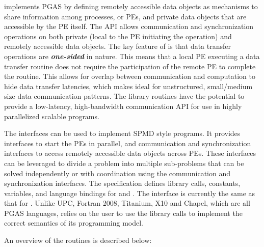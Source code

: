 \openshmem implements \ac{PGAS} by defining remotely accessible data objects as
mechanisms to share information among \openshmem processes, or \acp{PE}, and
private data objects that are accessible by the \ac{PE} itself. The \ac{API}
allows communication and synchronization operations on both private (local to
the PE initiating the operation) and remotely accessible data objects. The key
feature of \openshmem is that data transfer operations are
\textit{\textbf{one-sided}} in nature. This means that a local \ac{PE} executing
a data transfer routine does not require the participation of the remote \ac{PE}
to complete the routine. This allows for overlap between communication and
computation to hide data transfer latencies, which makes  \openshmem ideal for
unstructured, small/medium size data communication patterns. The \openshmem
library routines have the potential to provide a low-latency, high-bandwidth
communication \ac{API} for use in highly parallelized scalable programs.  

The \openshmem{} interfaces can be used to implement \ac{SPMD} style programs.
It provides interfaces to start the \openshmem{} \acp{PE} in parallel, and
communication and synchronization interfaces to access remotely accessible data
objects across \acp{PE}. These interfaces can be leveraged to divide a problem
into multiple sub-problems that can be solved independently or with coordination
using the communication and synchronization interfaces.  The \openshmem
specification defines library calls, constants, variables, and language bindings
for \Cstd and \Fortran.  The \Cpp interface is currently the same as that
for \Cstd. Unlike UPC, Fortran 2008, Titanium, X10 and Chapel, which are all
PGAS languages, \openshmem relies on the user to use the library calls  to
implement the correct semantics of its programming model.

An overview of the \openshmem routines is described below:

